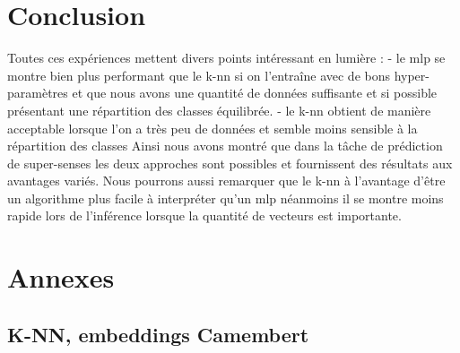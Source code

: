 \documentclass[12pt]{article}
\begin{document}
\section{Conclusion}

Toutes ces expériences mettent divers points intéressant en lumière : 
- le mlp se montre bien plus performant que le k-nn si on l'entraîne avec de bons hyper-paramètres
et que nous avons une quantité de données suffisante et si possible présentant une répartition des classes équilibrée.
- le k-nn obtient de manière acceptable lorsque l'on a très peu de données et semble moins sensible à la répartition des classes
Ainsi nous avons montré que dans la tâche de prédiction de super-senses les deux approches sont possibles et fournissent des résultats aux 
avantages variés. Nous pourrons aussi remarquer que le k-nn à l'avantage d'être un algorithme plus facile à interpréter qu'un mlp néanmoins 
il se montre moins rapide lors de l'inférence lorsque la quantité de vecteurs est importante. 

\renewcommand{\refname}{Bibliographie}

 

\section{Annexes}

\subsection{K-NN, embeddings Camembert}
\end{document}
